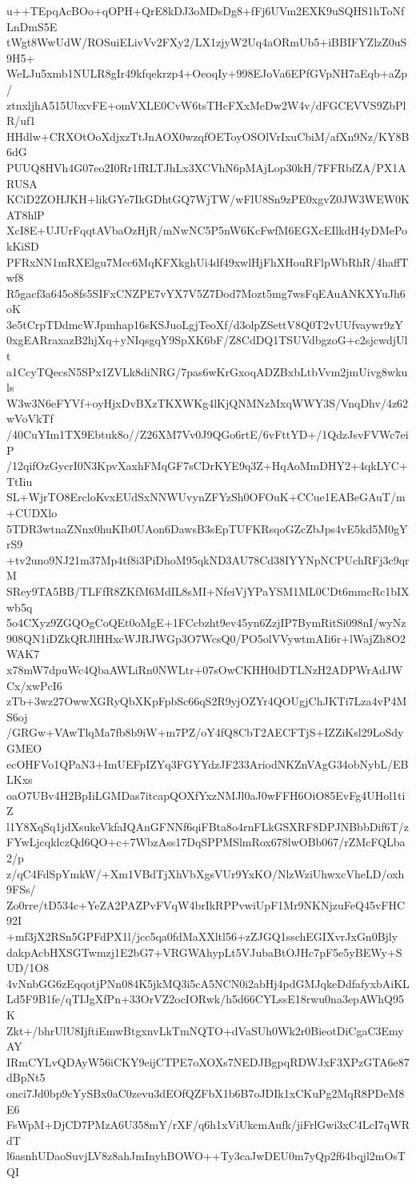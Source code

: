 u++TEpqAcBOo+qOPH+QrE8kDJ3oMDsDg8+fFj6UVm2EXK9uSQHS1hToNfLnDmS5E
tWgt8WwUdW/ROSuiELivVv2FXy2/LX1zjyW2Uq4aORmUb5+iBBIFYZlzZ0uS9H5+
WeLJu5xmb1NULR8gIr49kfqekrzp4+OeoqIy+998EJoVa6EPfGVpNH7aEqb+aZp/
ztnxljhA515UbxvFE+omVXLE0CvW6tsTHcFXxMeDw2W4v/dFGCEVVS9ZbPlR/uf1
HHdlw+CRXOtOoXdjxzTtJnAOX0wzqfOEToyOSOlVrIxuCbiM/afXn9Nz/KY8B6dG
PUUQ8HVh4G07eo2I0Rr1fRLTJhLx3XCVhN6pMAjLop30kH/7FFRbfZA/PX1ARUSA
KCiD2ZOHJKH+likGYe7IkGDhtGQ7WjTW/wFlU8Sn9zPE0xgvZ0JW3WEW0KAT8hlP
XcI8E+UJUrFqqtAVbaOzHjR/mNwNC5P5nW6KcFwfM6EGXcEIlkdH4yDMePokKiSD
PFRxNN1mRXElgu7Mcc6MqKFXkghUi4df49xwlHjFhXHouRFlpWbRhR/4haffTwf8
R5gacf3a645o8fs5SIFxCNZPE7vYX7V5Z7Dod7Mozt5mg7wsFqEAuANKXYuJh6oK
3e5tCrpTDdmcWJpmhap16sKSJuoLgjTeoXf/d3olpZSettV8Q0T2vUUfvaywr9zY
0xgEARraxazB2hjXq+yNIqsgqY9SpXK6bF/Z8CdDQ1TSUVdbgzoG+c2sjcwdjUlt
a1CcyTQecsN5SPx1ZVLk8diNRG/7pas6wKrGxoqADZBxbLtbVvm2jmUivg8wkuls
W3w3N6eFYVf+oyHjxDvBXzTKXWKg4lKjQNMNzMxqWWY3S/VnqDhv/4z62wVoVkTf
/40CuYIm1TX9Ebtuk8o//Z26XM7Vv0J9QGo6rtE/6vFttYD+/1QdzJsvFVWc7eiP
/12qifOzGycrI0N3KpvXaxhFMqGF7sCDrKYE9q3Z+HqAoMmDHY2+4qkLYC+TtIiu
SL+WjrTO8ErcloKvxEUdSxNNWUvynZFYzSh0OFOuK+CCue1EABeGAuT/m+CUDXlo
5TDR3wtnaZNnx0huKIb0UAon6DawsB3sEpTUFKRsqoGZcZbJps4vE5kd5M0gYrS9
+tv2uno9NJ21m37Mp4tf8i3PiDhoM95qkND3AU78Cd38IYYNpNCPUchRFj3c9qrM
SRey9TA5BB/TLFfR8ZKfM6MdIL8sMI+NfeiVjYPaYSM1ML0CDt6mmcRc1bIXwb5q
5o4CXyz9ZGQOgCoQEt0oMgE+1FCcbzht9ev45yn6ZzjIP7BymRitSi098nI/wyNz
908QN1iDZkQRJlHHxcWJRJWGp3O7WcsQ0/PO5olVVywtmAIi6r+lWajZh8O2WAK7
x78mW7dpuWc4QbaAWLiRn0NWLtr+07sOwCKHH0dDTLNzH2ADPWrAdJWCx/xwPcI6
zTb+3wz27OwwXGRyQbXKpFpbSc66qS2R9yjOZYr4QOUgjChJKTi7Lza4vP4MS6oj
/GRGw+VAwTlqMa7fb8b9iW+m7PZ/oY4fQ8CbT2AECFTjS+IZZiKsl29LoSdyGMEO
ecOHFVo1QPaN3+ImUEFpIZYq3FGYYdzJF233AriodNKZnVAgG34obNybL/EBLKxs
oaO7UBv4H2BpIiLGMDas7itcapQOXfYxzNMJl0aJ0wFFH6OiO85EvFg4UHol1tiZ
l1Y8XqSq1jdXsukeVkfaIQAnGFNNf6qiFBta8o4rnFLkGSXRF8DPJNBbbDif6T/z
FYwLjcqklczQd6QO+c+7WbzAss17DqSPPMSlmRox678lwOBb067/rZMcFQLba2/p
z/qC4FdSpYmkW/+Xm1VBdTjXhVbXgsVUr9YxKO/NlzWziUhwxcVheLD/oxh9FSs/
Zo0rre/tD534c+YeZA2PAZPvFVqW4brIkRPPvwiUpF1Mr9NKNjzuFeQ45vFHC92I
+mf3jX2RSn5GPFdPX1l/jcc5qa0fdMaXXltl56+zZJGQ1sschEGIXvrJxGn0Bjly
dakpAcbHXSGTwmzj1E2bG7+VRGWAhypLt5VJubaBtOJHc7pF5e5yBEWy+SUD/1O8
4vNnbGG6zEqqotjPNn084K5jkMQ3i5cA5NCN0i2abHj4pdGMJqkeDdfafyxbAiKL
Ld5F9B1fe/qTIJgXfPn+33OrVZ2ocIORwk/h5d66CYLssE18rwu0na3epAWhQ95K
Zkt+/bhrUlU8IjftiEmwBtgxnvLkTmNQTO+dVaSUh0Wk2r0BieotDiCgaC3EmyAY
IRmCYLvQDAyW56iCKY9eijCTPE7oXOXs7NEDJBgpqRDWJxF3XPzGTA6e87dBpNt5
onci7Jd0bp9cYySBx0aC0zevu3dEOfQZFbX1b6B7oJDIk1xCKuPg2MqR8PDeM8E6
FsWpM+DjCD7PMzA6U358mY/rXF/q6h1xViUkcmAufk/jiFrlGwi3xC4LcI7qWRdT
l6asnhUDaoSuvjLV8z8ahJmInyhBOWO++Ty3caJwDEU0m7yQp2f64bqjl2mOsTQI
